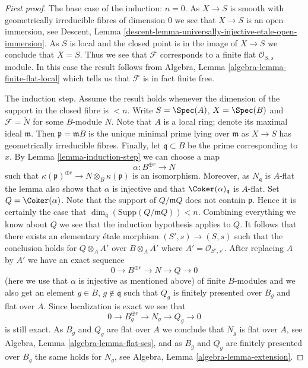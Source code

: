 \begin{proof}[First proof]
\medskip\noindent
The base case of the induction: $n = 0$.
As $X \to S$ is smooth with geometrically
irreducible fibres of dimension $0$ we see that $X \to S$ is an open
immersion, see
Descent, Lemma \ref{descent-lemma-universally-injective-etale-open-immersion}.
As $S$ is local and the closed point is in the image of $X \to S$
we conclude that $X = S$. Thus we see that $\mathcal{F}$ corresponds
to a finite flat $\mathcal{O}_{S, s}$ module. In this case the result
follows from
Algebra, Lemma \ref{algebra-lemma-finite-flat-local}
which tells us that $\mathcal{F}$ is in fact finite free.

\medskip\noindent
The induction step. Assume the result holds whenever the dimension
of the support in the closed fibre is $< n$. Write $S = \Spec(A)$,
$X = \Spec(B)$ and $\mathcal{F} = \widetilde{N}$ for some $B$-module
$N$. Note that $A$ is a local ring; denote its maximal ideal $\mathfrak m$.
Then $\mathfrak p = \mathfrak mB$ is the unique minimal prime lying over
$\mathfrak m$ as $X \to S$ has geometrically irreducible fibres. Finally,
let $\mathfrak q \subset B$ be the prime corresponding to $x$. By
Lemma \ref{lemma-induction-step}
we can choose a map
$$
\alpha : B^{\oplus r} \to N
$$
such that $\kappa(\mathfrak p)^{\oplus r} \to N \otimes_B \kappa(\mathfrak p)$
is an isomorphism. Moreover, as $N_{\mathfrak q}$ is $A$-flat the lemma
also shows that $\alpha$ is injective and that
$\Coker(\alpha)_{\mathfrak q}$ is $A$-flat.
Set $Q = \Coker(\alpha)$. Note that the support of $Q/\mathfrak mQ$
does not contain $\mathfrak p$. Hence it is certainly the case that
$\dim_{\mathfrak q}(\text{Supp}(Q/\mathfrak mQ)) < n$.
Combining everything we know about $Q$ we see
that the induction hypothesis applies to $Q$. It follows that there exists
an elementary \'etale morphism $(S', s) \to (S, s)$ such that the conclusion
holds for $Q \otimes_A A'$ over $B \otimes_A A'$ where
$A' = \mathcal{O}_{S', s'}$. After replacing $A$ by $A'$ we have an
exact sequence
$$
0 \to B^{\oplus r} \to N \to Q \to 0
$$
(here we use that $\alpha$ is injective as mentioned above)
of finite $B$-modules and we also get an element
$g \in B$, $g \not \in \mathfrak q$ such that
$Q_g$ is finitely presented over $B_g$ and flat over $A$. Since localization
is exact we see that
$$
0 \to B_g^{\oplus r} \to N_g \to Q_g \to 0
$$
is still exact. As $B_g$ and $Q_g$ are flat over $A$ we conclude that
$N_g$ is flat over $A$, see
Algebra, Lemma \ref{algebra-lemma-flat-ses},
and as $B_g$ and $Q_g$ are finitely presented over $B_g$ the same holds
for $N_g$, see
Algebra, Lemma \ref{algebra-lemma-extension}.
\end{proof}

